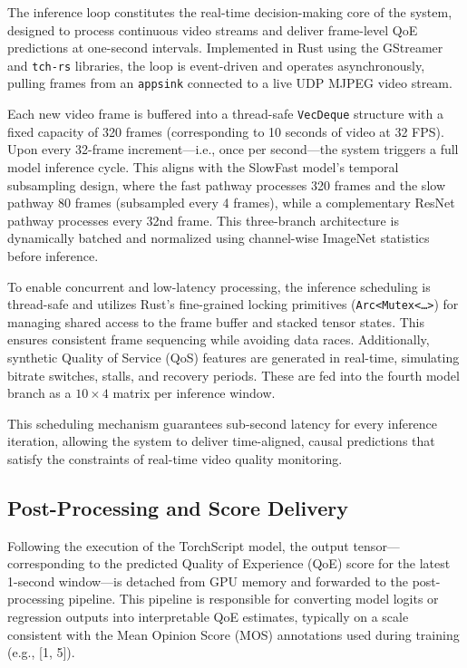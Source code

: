 The inference loop constitutes the real-time decision-making core of the system, designed to process continuous video streams and deliver frame-level QoE predictions at one-second intervals. Implemented in Rust using the GStreamer and \texttt{tch-rs} libraries, the loop is event-driven and operates asynchronously, pulling frames from an \texttt{appsink} connected to a live UDP MJPEG video stream.

Each new video frame is buffered into a thread-safe \texttt{VecDeque} structure with a fixed capacity of 320 frames (corresponding to 10 seconds of video at 32 FPS). Upon every 32-frame increment—i.e., once per second—the system triggers a full model inference cycle. This aligns with the SlowFast model's temporal subsampling design, where the fast pathway processes 320 frames and the slow pathway 80 frames (subsampled every 4 frames), while a complementary ResNet pathway processes every 32nd frame. This three-branch architecture is dynamically batched and normalized using channel-wise ImageNet statistics before inference.

To enable concurrent and low-latency processing, the inference scheduling is thread-safe and utilizes Rust's fine-grained locking primitives (\texttt{Arc<Mutex<\ldots>}) for managing shared access to the frame buffer and stacked tensor states. This ensures consistent frame sequencing while avoiding data races. Additionally, synthetic Quality of Service (QoS) features are generated in real-time, simulating bitrate switches, stalls, and recovery periods. These are fed into the fourth model branch as a $10 \times 4$ matrix per inference window.

This scheduling mechanism guarantees sub-second latency for every inference iteration, allowing the system to deliver time-aligned, causal predictions that satisfy the constraints of real-time video quality monitoring.

\subsection{Post-Processing and Score Delivery}
\label{sec:post_processing}

Following the execution of the TorchScript model, the output tensor—corresponding to the predicted Quality of Experience (QoE) score for the latest 1-second window—is detached from GPU memory and forwarded to the post-processing pipeline. This pipeline is responsible for converting model logits or regression outputs into interpretable QoE estimates, typically on a scale consistent with the Mean Opinion Score (MOS) annotations used during training (e.g., [1, 5]).

